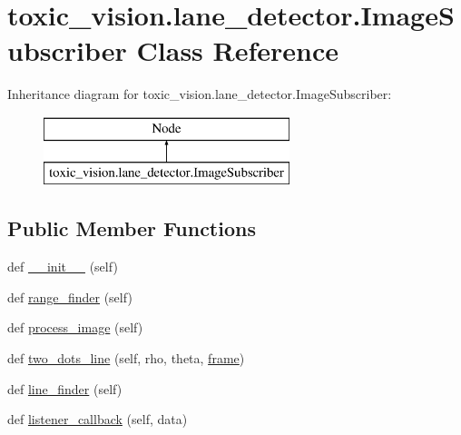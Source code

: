\hypertarget{classtoxic__vision_1_1lane__detector_1_1ImageSubscriber}{}\section{toxic\+\_\+vision.\+lane\+\_\+detector.\+Image\+Subscriber Class Reference}
\label{classtoxic__vision_1_1lane__detector_1_1ImageSubscriber}
Inheritance diagram for toxic\+\_\+vision.\+lane\+\_\+detector.\+Image\+Subscriber\+:\begin{figure}[H]
\begin{center}
\leavevmode
\includegraphics[height=2.000000cm]{d8/d32/classtoxic__vision_1_1lane__detector_1_1ImageSubscriber}
\end{center}
\end{figure}
\subsection*{Public Member Functions}
\begin{DoxyCompactItemize}
\item 
def \mbox{\hyperlink{classtoxic__vision_1_1lane__detector_1_1ImageSubscriber_ae9d3870aee6daf064f09b18433848f69}{\+\_\+\+\_\+init\+\_\+\+\_\+}} (self)
\item 
def \mbox{\hyperlink{classtoxic__vision_1_1lane__detector_1_1ImageSubscriber_af3af662eaf2448ebb0173fd250b7a84e}{range\+\_\+finder}} (self)
\item 
def \mbox{\hyperlink{classtoxic__vision_1_1lane__detector_1_1ImageSubscriber_a8e71a6a7a40f85be189210233e10dec7}{process\+\_\+image}} (self)
\item 
def \mbox{\hyperlink{classtoxic__vision_1_1lane__detector_1_1ImageSubscriber_a735f730b4ec559287644a2e0c7a32bdf}{two\+\_\+dots\+\_\+line}} (self, rho, theta, \mbox{\hyperlink{namespacetoxic__vision_1_1lane__detector_a13998232e16bd76d1da86f068ac01230}{frame}})
\item 
def \mbox{\hyperlink{classtoxic__vision_1_1lane__detector_1_1ImageSubscriber_ad97ae70647a4309715d25844c63866af}{line\+\_\+finder}} (self)
\item 
def \mbox{\hyperlink{classtoxic__vision_1_1lane__detector_1_1ImageSubscriber_ac3107a3938bce07626b58af88422aab0}{listener\+\_\+callback}} (self, data)
\end{DoxyCompactItemize}
